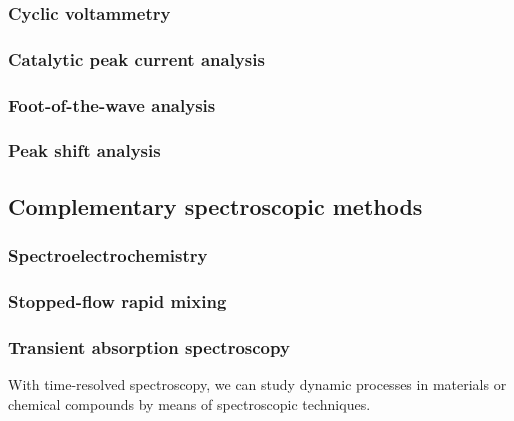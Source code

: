 \documentclass{article}
\numberwithin{theorem}{section}
\numberwithin{corollary}{section}
\numberwithin{postulate}{section}
\numberwithin{lemma}{section}
\numberwithin{definition}{section}
\begin{document}
\subsubsection{Cyclic voltammetry}

\subsubsection{Catalytic peak current analysis}

\subsubsection{Foot-of-the-wave analysis}

\subsubsection{Peak shift analysis}

\subsection{Complementary spectroscopic methods}

\subsubsection{Spectroelectrochemistry}

\subsubsection{Stopped-flow rapid mixing}

\subsubsection{Transient absorption spectroscopy}

With time-resolved spectroscopy, we can study dynamic processes in materials or
chemical compounds by means of spectroscopic techniques.
\end{document}
